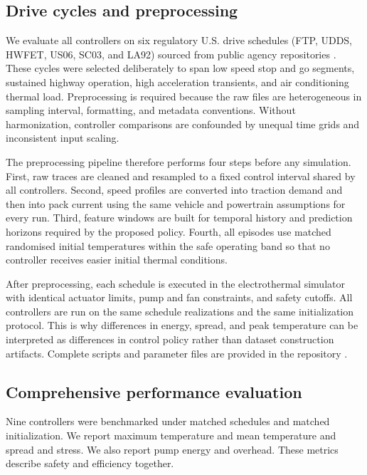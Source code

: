 \documentclass[twocolumn]{article}
\begin{document}
\subsection*{Drive cycles and preprocessing}

We evaluate all controllers on six regulatory U.S. drive schedules (FTP, UDDS, HWFET, US06, SC03, and LA92) sourced from public agency repositories \cite{EPA_Dynamometer}. These cycles were selected deliberately to span low speed stop and go segments, sustained highway operation, high acceleration transients, and air conditioning thermal load. Preprocessing is required because the raw files are heterogeneous in sampling interval, formatting, and metadata conventions. Without harmonization, controller comparisons are confounded by unequal time grids and inconsistent input scaling.

The preprocessing pipeline therefore performs four steps before any simulation. First, raw traces are cleaned and resampled to a fixed control interval shared by all controllers. Second, speed profiles are converted into traction demand and then into pack current using the same vehicle and powertrain assumptions for every run. Third, feature windows are built for temporal history and prediction horizons required by the proposed policy. Fourth, all episodes use matched randomised initial temperatures within the safe operating band so that no controller receives easier initial thermal conditions.

After preprocessing, each schedule is executed in the electrothermal simulator with identical actuator limits, pump and fan constraints, and safety cutoffs. All controllers are run on the same schedule realizations and the same initialization protocol. This is why differences in energy, spread, and peak temperature can be interpreted as differences in control policy rather than dataset construction artifacts. Complete scripts and parameter files are provided in the repository \cite{KeshavRepo2026}.

\subsection*{Comprehensive performance evaluation}

Nine controllers were benchmarked under matched schedules and matched initialization. We report maximum temperature and mean temperature and spread and stress. We also report pump energy and overhead. These metrics describe safety and efficiency together.
\end{document}
